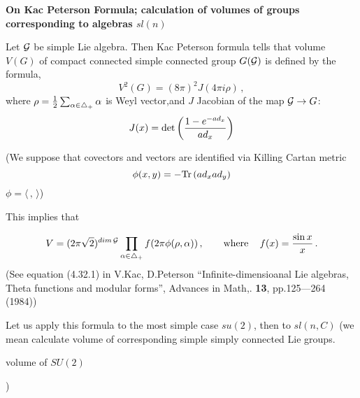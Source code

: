 \baselineskip-14pt

\def\e{{\bf e}}
\def\f{{\bf f}}
\def\y{{\bf y}}
\def\p{\partial}
\def\a{\alpha}
\def\t{\tilde}
\def\G {{\cal G}}
\def\C {{\bf C}}
\def\vare{\varepsilon}
\def\t {{\bf t}}
\def\Tr {{\rm Tr\,}}
\def\G {{\cal G}}

   \centerline {\bf On Kac Peterson Formula; calculation of volumes of groups
   corresponding to algebras $sl(n)$}

\medskip

   Let $\G$ be simple Lie algebra. Then
Kac Peterson formula tells that
        volume $V(G)$ of compact connected simple connected group  
$G(\G)$ is defined by the formula,
      $$
V^2(G)=(8\pi)^2J(4\pi i\rho)\,,
       $$
where $\rho={1\over 2}\sum_{\a\in\triangle_+}\a$
is Weyl vector,and $J$ Jacobian of the map $\G\to G$:
      $$
J(x)=\det\left(1-e^{-ad_x}\over ad_x\right)
      $$

(We suppose that covectors and vectors are identified
via  Killing Cartan metric
       $$
 \phi(x,y)=-{\rm Tr}\left(ad_x ad_y\right)
       $$ 
$\phi=\langle\,,\,\rangle$)

 This implies that

          $$
V=(2\pi\sqrt 2)^{{ dim\,}\G}
\prod_{\a\in\triangle_+}
f(2\pi\phi(\rho,\a))
\,,\qquad {\rm where}\,\quad f(x)={\sin x\over x}\,. 
          $$
(See equation (4.32.1) in
 V.Kac, D.Peterson ``Infinite-dimensioanal Lie algebras, Theta functions
and modular forms'', Advances in Math,. {\bf 13}, pp.125---264 (1984))


Let us apply this formula to the most simple case $su(2)$,
then to $sl(n,C)$ (we mean calculate volume of corresponding simple
simply connected Lie groups.


     \centerline {volume of $SU(2)$})

